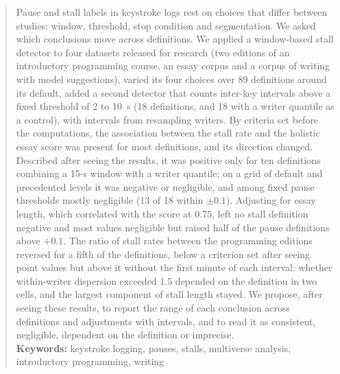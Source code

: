 \begin{abstract}
Pause and stall labels in keystroke logs rest on choices that differ between studies: window, threshold, stop condition
and segmentation. We asked which conclusions
move across definitions. We applied a window-based stall detector to four datasets released for research (two
editions of an introductory programming course, an essay corpus and a corpus of writing with model suggestions),
varied its four choices over 89 definitions around its default, added a second detector that counts
inter-key intervals above a fixed threshold of 2 to 10~s (18 definitions, and 18 with a writer quantile as a
control), with intervals from resampling writers.
By criteria set before the computations, the association between the stall rate and the holistic essay score was
present for most definitions, and its direction changed. Described after seeing the results, it was positive only for
ten definitions combining a 15-s window with a writer quantile; on a grid of default and
precedented levels it was negative or negligible, and among fixed pause thresholds mostly negligible (13 of 18 within
$\pm 0.1$). Adjusting for essay length, which correlated with the score at 0.75, left no stall definition negative and
most values negligible but raised half of the pause definitions above $+0.1$. The ratio of stall rates between the
programming editions reversed for a fifth of the definitions, below a criterion set after seeing point values but above it without the first minute of each interval; whether
within-writer dispersion exceeded 1.5 depended on the definition in two cells, and the largest component of stall
length stayed. We propose, after seeing these results, to report the range of each conclusion
across definitions and adjustments with intervals, and to read it as consistent, negligible, dependent on the
definition or imprecise.\\

{\parindent0pt
\textbf{Keywords:} keystroke logging, pauses, stalls, multiverse analysis, introductory programming, writing
}
\end{abstract}
